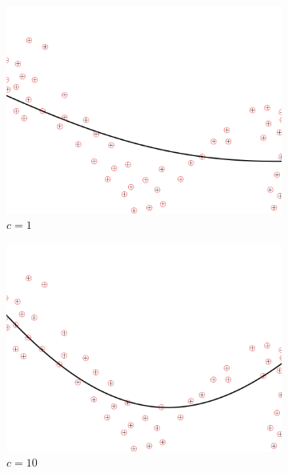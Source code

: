 \documentclass[a4paper, 11pt, one column]{article}
\begin{document}
\begin{figure}[]
\begin{subfigure}{0.33\linewidth}
            \includegraphics[width=\linewidth]{images/rbf_2_c_1.png}
            \caption{$c=1$}
        \end{subfigure}\hfil
        \begin{subfigure}{0.33\linewidth}
            \includegraphics[width=\linewidth]{images/rbf_2_c_10.png}
            \caption{$c=10$}
        \end{subfigure}\hfil
        \begin{subfigure}{0.33\linewidth}

\end{subfigure}
\end{figure}
\end{document}
